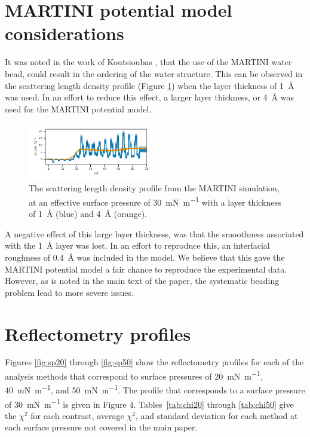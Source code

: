 \documentclass[amsmath,amssymb,superscriptaddress]{revtex4-1}
\begin{document}
\section{MARTINI potential model considerations}
It was noted in the work of Koutsioubas \cite{koutsioubas_combined_2016}, that the use of the MARTINI water bead, could result in the ordering of the water structure.
This can be observed in the scattering length density profile (Figure \ref{fig:mart}) when the layer thickness of \SI{1}{\angstrom} was used.
In an effort to reduce this effect, a larger layer thickness, or \SI{4}{\angstrom} was used for the MARTINI potential model.
%
\begin{figure}
 \centering
 \includegraphics[width=0.49\textwidth]{martini_order}
 \caption{The scattering length density profile from the MARTINI simulation, at an effective surface pressure of \SI{30}{\milli\newton\per\meter} with a layer thickness of \SI{1}{\angstrom} (blue) and \SI{4}{\angstrom} (orange). }
 \label{fig:mart}
\end{figure}
%

A negative effect of this large layer thickness, was that the smoothness associated with the \SI{1}{\angstrom} layer was lost.
In an effort to reproduce this, an interfacial roughness of \SI{0.4}{\angstrom} was included in the model.
We believe that this gave the MARTINI potential model a fair chance to reproduce the experimental data.
However, as is noted in the main text of the paper, the systematic beading problem lead to more severe issues.

\section{Reflectometry profiles}
Figures \ref{fig:sp20} through \ref{fig:sp50} show the reflectometry profiles for each of the analysis methods that correspond to surface pressures of \SI{20}{\milli\newton\per\meter}, \SI{40}{\milli\newton\per\meter}, and \SI{50}{\milli\newton\per\meter}.
The profile that corresponds to a surface pressure of \SI{30}{\milli\newton\per\meter} is given in Figure 4.
Tables~\ref{tab:chi20} through \ref{tab:chi50} give the $\chi^2$ for each contrast, average $\chi^2$, and standard deviation for each method at each surface pressure not covered in the main paper.
\end{document}
